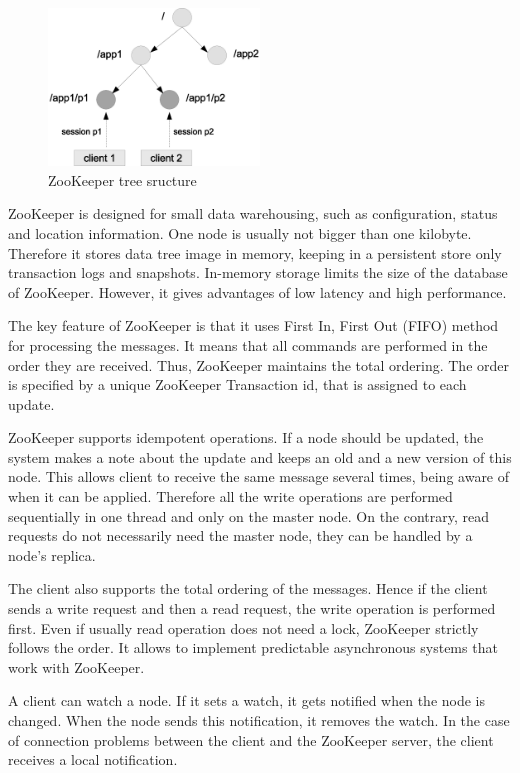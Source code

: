 \begin{figure}
  \centering
  \includegraphics [width=0.5\textwidth]{images/zookeeper_tree}
  \caption{ZooKeeper tree sructure}
  \label{fig:zookeeper_tree}
\end{figure}

ZooKeeper is designed for small data warehousing, such as configuration, status and location information.
One node is usually not bigger than one kilobyte.
Therefore it stores data tree image in memory, keeping in a persistent store only transaction logs and snapshots.
In-memory storage limits the size of the database of ZooKeeper.
However, it gives advantages of low latency and high performance. 

The key feature of ZooKeeper is that it uses First In, First Out (FIFO) method for processing the messages.
It means that all commands are performed in the order they are received.
Thus, ZooKeeper maintains the total ordering.
The order is specified by a unique ZooKeeper Transaction id, that is assigned to each update.
 
ZooKeeper supports idempotent operations.
If a node should be updated, the system makes a note about the update and keeps an old and a new version of this node.
This allows client to receive the same message several times, being aware of when it can be applied.
Therefore all the write operations are performed sequentially in one thread and only on the master node.
On the contrary, read requests do not necessarily need the master node, they can be handled by a node's replica.

The client also supports the total ordering of the messages.
Hence if the client sends a write request and then a read request, the write operation is performed first.
Even if usually read operation does not need a lock, ZooKeeper strictly follows the order.
It allows to implement predictable asynchronous systems that work with ZooKeeper.

A client can watch a node.
If it sets a watch, it gets notified when the node is changed.
When the node sends this notification, it removes the watch.
In the case of connection problems between the client and the ZooKeeper server, the client receives a local notification.

